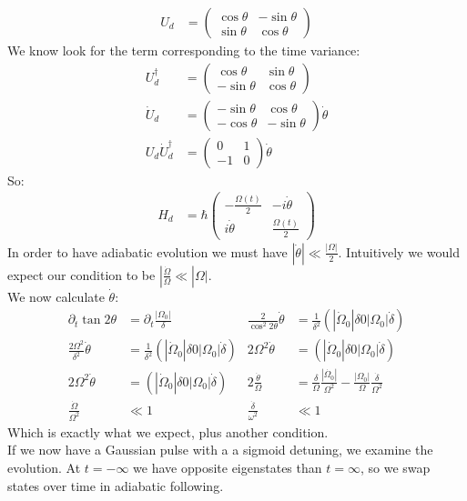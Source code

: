 \begin{align*}
	U_d &= \begin{pmatrix}
		\cos\theta & -\sin\theta \\
		\sin\theta & \cos\theta
	\end{pmatrix}
\end{align*}
We know look for the term corresponding to the time variance:
\begin{align*}
	U_d^\dagger &= \begin{pmatrix}
		\cos\theta & \sin\theta \\
		-\sin\theta & \cos\theta
		\end{pmatrix}\\
	\dot{U}_d &= \begin{pmatrix}
		-\sin\theta & \cos\theta \\
		-\cos\theta & -\sin\theta
	\end{pmatrix}\dot{\theta} \\
		U_d\dot{U}_d^\dagger &= \begin{pmatrix}
			0 & 1 \\
			-1 & 0
		\end{pmatrix} \dot{\theta}
\end{align*}
So:
\begin{align*}
	H_d &= \hbar \begin{pmatrix}
		-\frac{\Omega(t)}{2} & -i\dot{\theta} \\
		i\dot{\theta} & \frac{\Omega(t)}{2}
	      \end{pmatrix}
\end{align*}
In order to have adiabatic evolution we must have $|\dot{\theta}| \ll \frac{|\Omega|}{2}$. Intuitively we would expect our condition to be $|\frac{\dot{\Omega}}{\Omega} \ll |\Omega|$. \\
We now calculate $\dot{\theta}$:
\begin{align*}
	\partial_t \tan 2\theta &= \partial_t \frac{|\Omega_0|}{\delta} &
	\frac{2}{\cos^2 2\theta} \dot{\theta} &= \frac{1}{\delta^2}\left(|\dot{\Omega}_0|\delta 0 |\Omega_0|\dot{\delta}\right) \\
	\frac{2\Omega^2}{\delta^2} \dot{\theta} &= \frac{1}{\delta^2}\left(|\dot{\Omega}_0|\delta 0 |\Omega_0|\dot{\delta}\right) &
	2\Omega^2\dot{\theta} &= \left(|\dot{\Omega}_0|\delta 0 |\Omega_0|\dot{\delta}\right) \\
	2\Omega^2\dot{\theta} &= \left(|\dot{\Omega}_0|\delta 0 |\Omega_0|\dot{\delta}\right) &
	2\frac{\dot{\theta}}{\Omega} &= \frac{\delta}{\Omega} \frac{|\dot{\Omega_0}|}{\Omega^2} - \frac{|\Omega_0|}{\Omega} \frac{\dot{\delta}}{\Omega^2}  \\
	\frac{\dot{\Omega}}{\Omega^2} &\ll 1 &
	\frac{\dot{\delta}}{\omega^2} &\ll 1
\end{align*}
Which is exactly what we expect, plus another condition. \\
If we now have a Gaussian pulse with a a sigmoid detuning, we examine the evolution. At $t=-\infty$ we have opposite eigenstates than $t=\infty$, so we swap states over time in adiabatic following.
